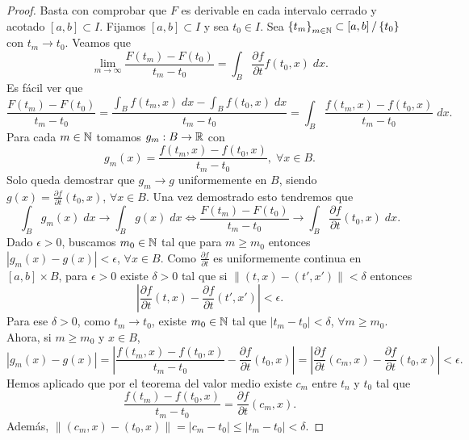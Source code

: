 \begin{proof}
	Basta con comprobar que $\displaystyle F $ es derivable en cada intervalo cerrado y acotado $\displaystyle \left[a,b\right] \subset I $. Fijamos $\displaystyle \left[a,b\right] \subset I $ y sea $\displaystyle t_{0} \in I $. Sea $\displaystyle \left\{ t_{m}\right\} _{m\in\mathbb{N}}\subset\left[a,b\right] / \left\{ t_{0}\right\}  $ con $\displaystyle t_{m}\to t_{0} $. Veamos que 
	\[\lim_{m \to \infty}\frac{F\left(t_{m}\right)-F\left(t_{0}\right)}{t_{m}-t_{0}}=\int _{B}\frac{\partial f}{\partial t}f\left(t_{0},x\right) \; dx .\]
Es fácil ver que
\[\frac{F\left(t_{m}\right)-F\left(t_{0}\right)}{t_{m}-t_{0}}=\frac{\int _{B}f\left(t_{m}, x\right) \; dx-\int _{B}f\left(t_{0}, x\right) \; dx}{t_{m}-t_{0}}=\int _{B}\frac{f\left(t_{m}, x\right)-f\left(t_{0},x\right)}{t_{m}-t_{0}} \; dx .\]
Para cada $\displaystyle m \in \mathbb{N} $ tomamos $\displaystyle g_{m} : B \to \mathbb{R} $ con 
\[g_{m}\left(x\right)=\frac{f\left(t_{m}, x\right)-f\left(t_{0}, x\right)}{t_{m}-t_{0}} , \; \forall x \in B.\]
Solo queda demostrar que $\displaystyle g_{m}\to g $ uniformemente en $\displaystyle B $, siendo $\displaystyle g\left(x\right)=\frac{\partial f}{\partial t}\left(t_{0}, x\right) $, $\displaystyle \forall x \in B $. Una vez demostrado esto tendremos que 
\[\int _{B}g_{m}\left(x\right) \; dx \to \int _{B}g\left(x\right) \; dx \iff \frac{F\left(t_{m}\right)-F\left(t_{0}\right)}{t_{m}-t_{0}}\to \int _{B}\frac{\partial f}{\partial t}\left(t_{0}, x\right) \; dx .\]
Dado $\displaystyle \epsilon > 0 $, buscamos $\displaystyle m_{0} \in \mathbb{N} $ tal que para $\displaystyle m \geq m_{0} $ entonces $\displaystyle \left|g_{m}\left(x\right)-g\left(x\right)\right|<\epsilon  $, $\displaystyle \forall x \in B $. Como $\displaystyle \frac{\partial f}{\partial t} $ es uniformemente continua en $\displaystyle \left[a,b\right] \times B $, para $\displaystyle \epsilon > 0 $ existe $\displaystyle \delta >0 $ tal que si $\displaystyle \|\left(t,x\right)-\left(t',x'\right)\| < \delta  $ entonces
\[ \left|\frac{\partial f}{\partial t}\left(t,x\right)-\frac{\partial f}{\partial t}\left(t',x'\right)\right|<\epsilon  .\]
Para ese $\displaystyle \delta > 0 $, como $\displaystyle t_{m}\to t_{0} $, existe $\displaystyle m_{0} \in \mathbb{N} $ tal que $\displaystyle \left|t_{m}-t_{0}\right|<\delta  $, $\displaystyle \forall m \geq m_{0} $. Ahora, si $\displaystyle m \geq m_{0} $ y $\displaystyle x \in B $,
\[ \left|g_{m}\left(x\right)-g\left(x\right)\right|= \left|\frac{f\left(t_{m}, x\right)-f\left(t_{0}, x\right)}{t_{m}-t_{0}}-\frac{\partial f}{\partial t}\left(t_{0}, x\right)\right|= \left|\frac{\partial f}{\partial t}\left(c_{m}, x\right)-\frac{\partial f}{\partial t}\left(t_{0}, x\right)\right|<\epsilon  .\]
Hemos aplicado que por el teorema del valor medio existe $\displaystyle c_{m} $ entre $\displaystyle t_{n} $ y $\displaystyle t_{0} $ tal que 
\[\frac{f\left(t_{m}\right)-f\left(t_{0}, x\right)}{t_{m}-t_{0}} = \frac{\partial f}{\partial t}\left(c_{m}, x\right) .\]
Además, $\displaystyle \|\left(c_{m}, x\right)-\left(t_{0}, x\right)\|= \left|c_{m}-t_{0}\right|\leq \left|t_{m}-t_{0}\right|<\delta  $. 
\end{proof}
